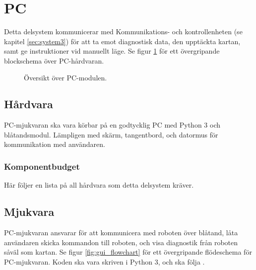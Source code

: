 \documentclass[a4paper,11pt]{article}
\begin{document}
\newpage
\section{PC} \label{sec:system4}
Detta delsystem kommunicerar med Kommunikations- och kontrollenheten (se kapitel \ref{sec:system3}) för att ta emot diagnostisk data, den upptäckta kartan, samt ge instruktioner vid manuellt läge. Se figur \ref{fig:unitPC} för ett övergripande blockschema över PC-hårdvaran.

\begin{figure}[h!]
    \caption{Översikt över PC-modulen.}
    \label{fig:unitPC}
\end{figure}
\subsection{Hårdvara}
PC-mjukvaran ska vara körbar på en godtycklig PC med Python 3 och blåtandsmodul. Lämpligen med skärm, tangentbord, och datormus för kommunikation med användaren.

\subsubsection{Komponentbudget}
Här följer en lista på all hårdvara som detta delsystem kräver.

\begin{center}
\begin{HardwareList}
\end{HardwareList}
\end{center}

\subsection{Mjukvara}
PC-mjukvaran ansvarar för att kommunicera med roboten över blåtand, låta användaren skicka kommandon till roboten, och visa diagnostik från roboten såväl som kartan. Se figur \ref{fig:gui_flowchart} för ett övergripande flödeschema för PC-mjukvaran. Koden ska vara skriven i Python 3, och ska följa \cite{pep8}.
\end{document}
